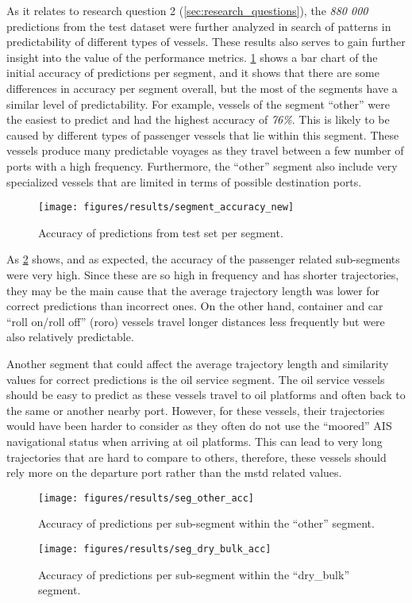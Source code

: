 As it relates to research question 2 (\cref{sec:research_questions}), the \textit{880 000} predictions from the test dataset were further analyzed in search of patterns in predictability of different types of vessels. These results also serves to gain further insight into the value of the performance metrics. \cref{fig:segment_accuracy} shows a bar chart of the initial accuracy of predictions per segment, and it shows that there are some differences in accuracy per segment overall, but the most of the segments have a similar level of predictability. For example, vessels of the segment ``other'' were the easiest to predict and had the highest accuracy of \textit{76\%}. This is likely to be caused by different types of passenger vessels that lie within this segment. These vessels produce many predictable voyages as they travel between a few number of ports with a high frequency. Furthermore, the ``other'' segment also include very specialized vessels that are limited in terms of possible destination ports.

\begin{figure}[htbp]
    \centering
    \texttt{[image: figures/results/segment\_accuracy\_new]}
    \caption{Accuracy of predictions from test set per segment.}
    \label{fig:segment_accuracy}
\end{figure}

As \cref{fig:other_accuracy} shows, and as expected, the accuracy of the passenger related sub-segments were very high. Since these are so high in frequency and has shorter trajectories, they may be the main cause that the average trajectory length was lower for correct predictions than incorrect ones. On the other hand, container and car ``roll on/roll off'' (roro) vessels travel longer distances less frequently but were also relatively predictable.

Another segment that could affect the average trajectory length and similarity values for correct predictions is the oil service segment. The oil service vessels should be easy to predict as these vessels travel to oil platforms and often back to the same or another nearby port. However, for these vessels, their trajectories would have been harder to consider as they often do not use the ``moored'' AIS navigational status when arriving at oil platforms. This can lead to very long trajectories that are hard to compare to others, therefore, these vessels should rely more on the departure port rather than the \acrshort{mstd} related values.

\begin{figure}[htbp]
    \centering
    \texttt{[image: figures/results/seg\_other\_acc]}
    \caption{Accuracy of predictions per sub-segment within the ``other'' segment.}
    \label{fig:other_accuracy}
\end{figure}
\begin{figure}[htbp]
    \centering
    \texttt{[image: figures/results/seg\_dry\_bulk\_acc]}
    \caption{Accuracy of predictions per sub-segment within the ``dry\_bulk'' segment.}
    \label{fig:dry_bulk_accuracy}
\end{figure}


